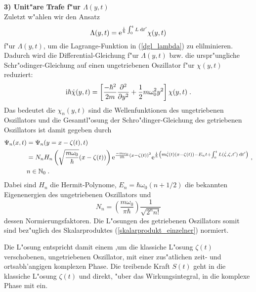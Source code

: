     \textbf{3) Unit"are Trafe f"ur $\Lambda(y,t)$}\\
    Zuletzt w"ahlen wir den Ansatz
    \begin{equation}
      \Lambda(y,t) = \text e^{\frac{\text i}{\hbar}\int_0^tL \: \text d t'}\chi(y,t)
    \end{equation}
    f"ur $\Lambda(y,t)$, um die Lagrange-Funktion in (\ref{dgl_lambda}) zu elilminieren.
    Dadurch wird die Differential-Gleichung f"ur $\Lambda(y,t)$ bzw. die urspr"ungliche Schr"odinger-Gleichung auf einen ungetriebenen Oszillator f"ur $\chi(y,t)$ reduziert:
    \begin{equation}
      \text i \hbar \dot \chi(y,t) = \left[ \frac{-\hbar^2}{2m}\frac{\partial^2}{\partial y^2} + \frac{1}{2}m\omega_0^2y^2 \right]\chi(y,t) \; .
    \end{equation}
    Das bedeutet die $\chi_n(y,t)$ sind die Wellenfunktionen des ungetriebenen Oszillators und die Gesamtl"osung der Schro"dinger-Gleichung des getriebenen Oszillators ist damit gegeben durch
    \begin{align}
      \begin{split}
      \Psi_n(x,t) &= \Psi_n(y=x-\zeta(t),t) \\
      &= N_nH_n\left(\sqrt{\frac{m\omega_0}{\hbar}}(x-\zeta(t))\right) \text e^{\frac{-m\omega_0}{2\hbar}(x-\zeta(t))^2} \text e^{\frac{\text i}{\hbar}\left(m\dot \zeta(t)(x-\zeta(t))-E_nt+\int_0^tL(\dot \zeta,\zeta,t')\:\text dt'\right)} \; , \\
      &n \in \mathbb{N}_0 \; .
    \end{split}
    \end{align}
    Dabei sind $H_n$ die Hermit-Polynome, $E_n = \hbar \omega_0(n+1/2)$ die bekannten Eigenenergien des ungetriebenen Oszillators und
    \begin{equation}
      N_n = \left(\frac{m\omega_0}{\pi \hbar}\right) \frac{1}{\sqrt{2^nn!}}
    \end{equation}
    dessen Normierungsfaktoren.
    Die L"osungen des getriebenen Oszillators somit sind bez"uglich des Skalarproduktes (\ref{skalarprodukt_einzelner}) normiert.

    Die L"osung entspricht damit einem ,um die klassiche L"osung $\zeta(t)$ verschobenen, ungetriebenen Oszillator, mit einer zus"atlichen zeit- und ortsabh'angigen komplexen Phase.
    Die treibende Kraft $S(t)$ geht in die klassiche L"osung $\zeta(t)$ und direkt, "uber das Wirkungsintegral, in die komplexe Phase mit ein.


